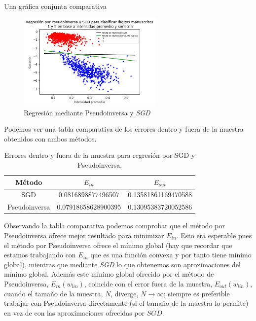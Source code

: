 \documentclass[11pt,a4paper]{article}
\theoremstyle{definition}
\begin{document}
	Una gráfica conjunta comparativa
	\begin{figure}[H]
		\centering
		\includegraphics[width=0.63\textwidth]{images/regre_comparativa}
		\caption{Regresión mediante Pseudoinversa y \textit{SGD}}
		\end{figure}
 Podemos ver una tabla comparativa de los errores dentro y fuera de la muestra obtenidos con ambos métodos.
	
	\begin{table}[htbp]
	\begin{center}
	\begin{tabular}{|c|c|c|}
	\hline
	Método & $E_{in}$ & $E_{out}$ \\
	\hline \hline
	SGD & 0.0816898877496507 & 0.13581861169470588\\ \hline
	Pseudoinversa & 0.07918658628900395 & 0.13095383720052586\\ \hline
	\end{tabular}
	\caption{Errores dentro y fuera de la muestra para regresión por SGD y Pseudoinversa.}
	\label{tabla:sencilla}
	\end{center}
	\end{table}
	
	Observando la tabla comparativa podemos comprobar que el método por Pseudoinversa ofrece mejor resultado para minimizar $E_{in}$. Esto era esperable pues el método por Pseudoinversa ofrece el mínimo global (hay que recordar que estamos trabajando con $E_{in}$ que es una función convexa y por tanto tiene mínimo global), mientras que mediante \textit{SGD} lo que obtenemos son aproximaciones del mínimo global. Además este mínimo global ofrecido por el método de Pseudoinversa, $E_{in}(w_{lin})$, coincide con el error fuera de la muestra, $E_{out}(w_{lin})$, cuando el tamaño de la muestra, $N$, diverge, $N\to \infty$; siempre es preferible trabajar con Pseudoinversa directamente (si el tamaño de la muestra lo permite) en vez de con las aproximaciones ofrecidas por $\textit{SGD}$.
	
\end{document}
